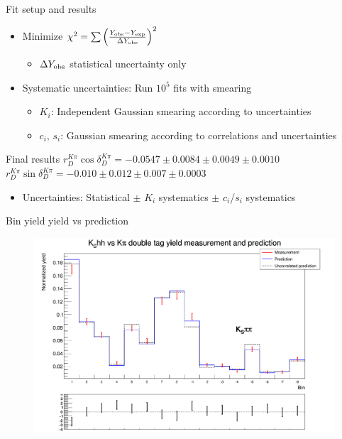 \documentclass{beamer}
\begin{document}
\begin{frame}{Fit setup and results}
  \begin{itemize}
    \setlength\itemsep{1.5em}
    \item{Minimize $\chi^2 = \sum\Big(\frac{Y_{\rm obs} - Y_{\rm exp}}{\Delta Y_{\rm obs}}\Big)^2$}
    \begin{itemize}
      \item{$\Delta Y_{\rm obs}$ statistical uncertainty only}
    \end{itemize}
    \item{Systematic uncertainties: Run $10^5$ fits with smearing}
    \begin{itemize}
      \item{$K_i$: Independent Gaussian smearing according to uncertainties}
      \item{$c_i$, $s_i$: Gaussian smearing according to correlations and uncertainties}
    \end{itemize}
  \end{itemize}
  \vspace{0.3cm}
  \begin{block}{Final results}
    \vspace{0.1cm}
    $r_D^{K\pi}\cos\delta_D^{K\pi} = -0.0547\pm0.0084\pm0.0049\pm0.0010$ \\
    \vspace{0.3cm}
    $r_D^{K\pi}\sin\delta_D^{K\pi} = -0.010\pm0.012\pm0.007\pm0.0003$
    \vspace{0.1cm}
  \end{block}
  \begin{itemize}
    \item{Uncertainties: Statistical $\pm$ $K_i$ systematics $\pm$ $c_i$/$s_i$ systematics}
  \end{itemize}
\end{frame}

\begin{frame}{Bin yield yield vs prediction}
  \begin{figure}
    \centering
    \includegraphics[width=\textwidth]{KSpipiVersusKpiYields.png}
  \end{figure}
\end{frame}
\end{document}
